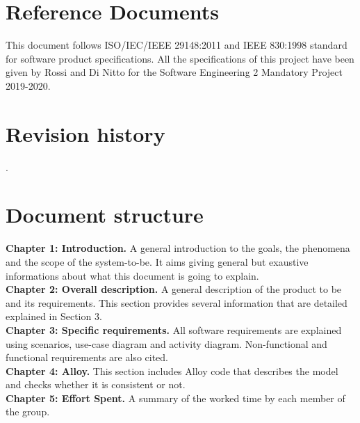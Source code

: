 \documentclass[a4paper, hidelinks, 12pt]{report}
\begin{document}
	\section{Reference Documents}\label{sec:reference-documents}
	This document follows ISO/IEC/IEEE 29148:2011 and IEEE 830:1998  standard for software product specifications.
	All the specifications of this project have been given by Rossi and Di Nitto for the Software Engineering 2 Mandatory Project 2019-2020.

	\section{Revision history}\label{sec:revision-history}
	.

	\section{Document structure}\label{sec:document-structure}
	\textbf{Chapter 1: Introduction.} A general introduction to the goals, the phenomena and the scope of the system-to-be. It aims giving general but exaustive informations about what this document is going to explain.
	\\
	\textbf{Chapter 2: Overall description.} A general description of the product to be and its requirements. This section provides several information that are detailed explained in Section 3.
	\\
	\textbf{Chapter 3: Specific requirements.} All software requirements are explained using scenarios, use-case diagram and activity diagram. Non-functional and functional requirements are also cited.
	\\
	\textbf{Chapter 4: Alloy.} This section includes Alloy code that describes the model and checks whether it is consistent or not.
	\\
	\textbf{Chapter 5: Effort Spent.} A summary of the worked time by each member of the group.
\end{document}
